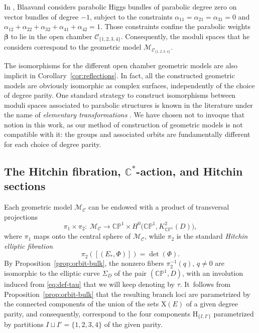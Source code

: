 \documentclass[10pt,a4paper]{amsart}
\newcommand{\field}[1]{\ensuremath{\mathbb{#1}}}
\newcommand{\CC}{\field{C}}
\newcommand{\PP}{\field{P}}
\newcommand{\curly}[1]{\mathscr{#1}}
\newcommand{\cM}{\curly{M}}
\newcommand{\qC}{\mathcal{C}}
\numberwithin{equation}{section}
\begin{document}
\begin{Remark}\label{rem:Blaavand}
In \cite[Section 6.7]{Bla15}, Blaavand considers parabolic Higgs bundles of parabolic degree zero on vector bundles of degree $-1$, subject to the constraints $\alpha_{11} = \alpha_{21} = \alpha_{31} = 0$ and $\alpha_{12}+\alpha_{22}+\alpha_{32}+\alpha_{41}+\alpha_{42} =1$. Those constraints confine the parabolic weights $\pmb{\beta}$ to lie in the open chamber $\qC_{\{1,2,3,4\}}$. Consequently, the moduli spaces that he considers correspond to the geometric model $\cM_{\qC_{\{1,2,3,4\}}}$.
\end{Remark}

\begin{Remark}
The isomorphisms for the different open chamber geometric models are also implicit in Corollary~\ref{cor:reflections}.
In fact, all the constructed geometric models are obviously isomorphic as complex surfaces, independently of the choice of degree parity. One standard strategy to construct isomorphisms between moduli spaces associated to parabolic structures is known in the literature under the name of \textit{elementary transformations} \cite{LS15,LSS13}. We have chosen not to invoque that notion in this work, as our method of construction of geometric models is not compatible with it: the groups and associated orbits are fundamentally different for each choice of degree parity.
\end{Remark}














\subsection[The Hitchin fibration, \protect{$C\textasciicircum{}{*}$}-action, and Hitchin sections]
{The Hitchin fibration, $\boldsymbol{\CC^{*}}$-action, and Hitchin sections}


Each geometric model $\cM_{\qC}$ can be endowed with a product of transversal projections
\[
\pi_{1}\times \pi_{2}\colon\ \cM_{\qC}\rightarrow \CC\PP^{1}\times H^{0}\bigl(\CC\PP^{1},K^{2}_{\CC\PP^{1}}(D)\bigr),
\]
where $\pi_{1}$ maps onto the central sphere of $\cM_{\qC}$, while $\pi_{2}$ is the standard \textit{Hitchin elliptic fibration}
\[
 \pi_{2}([(E_{*},\Phi)]) = \det(\Phi).
\]
By Proposition~\ref{prop:orbit-bulk}, the nonzero fibers $\pi_{2}^{-1}(q)$, $q\neq 0$ are isomorphic to the elliptic curve $\Sigma_{D}$ of the pair $(\CC\PP^{1},D)$, with an involution induced from \eqref{eq:def-tau} that we will keep denoting by $\tau$. It~follows from Proposition~\ref{prop:orbit-bulk} that the resulting branch loci are parametrized by the connected components of the union of the sets $\mathrm{X}(E)$ of a given degree parity, and consequently, correspond to the four components $\mathrm{H}_{\{I,I'\}}$ parametrized by partitions $I\sqcup I' = \{1,2,3,4\}$ of the given parity.
\end{document}
